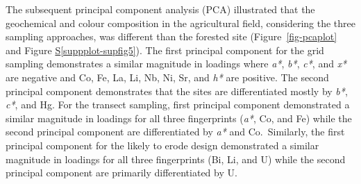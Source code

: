 \documentclass[
  number]{elsarticle}
\newcommand*\quartosuppplotref[1]{Figure \hyperref[#1]{S\ref{#1}}}
\begin{document}
\begin{table}
\begin{minipage}{\linewidth}


\end{minipage}%
\newline
\begin{minipage}{\linewidth}



\end{minipage}%

\end{table}%

The subsequent principal component analysis (PCA) illustrated that the
geochemical and colour composition in the agricultural field,
considering the three sampling approaches, was different than the
forested site (Figure~\ref{fig-pcaplot} and
\quartosuppplotref{suppplot-supfig5}). The first principal component for
the grid sampling demonstrates a similar magnitude in loadings where
\emph{a*}, \emph{b*}, \emph{c*}, and \emph{x*} are negative and Co, Fe,
La, Li, Nb, Ni, Sr, and \emph{h*} are positive. The second principal
component demonstrates that the sites are differentiated mostly by
\emph{b*}, \emph{c*}, and Hg. For the transect sampling, first principal
component demonstrated a similar magnitude in loadings for all three
fingerprints (\emph{a*}, Co, and Fe) while the second principal
component are differentiated by \emph{a*} and Co.~Similarly, the first
principal component for the likely to erode design demonstrated a
similar magnitude in loadings for all three fingerprints (Bi, Li, and U)
while the second principal component are primarily differentiated by U.
\end{document}
